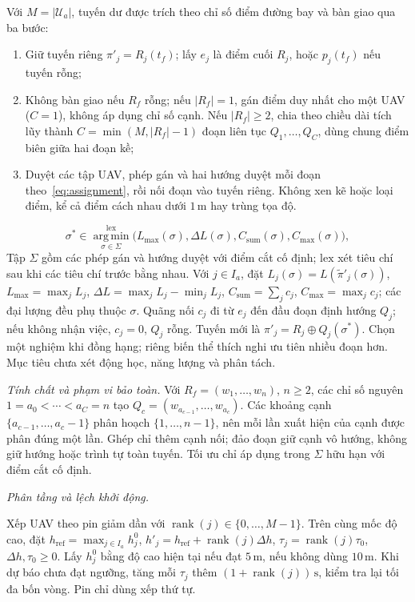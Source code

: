 \documentclass[11pt,a4paper]{article}
\newcommand{\Ua}{\mathcal{U}_{a}}
\newcommand{\Dh}{\Delta h}
\newcommand{\tauzero}{\tau_{0}}
\begin{document}
Với $M=|\Ua|$, tuyến dư được trích theo chỉ số điểm đường bay và bàn giao qua ba bước:
\begin{enumerate}[leftmargin=*,itemsep=2pt]
  \item Giữ tuyến riêng $\pi'_j=R_j(t_f)$; lấy $e_j$ là điểm cuối $R_j$, hoặc $p_j(t_f)$ nếu tuyến rỗng;
  \item Không bàn giao nếu $R_f$ rỗng; nếu $|R_f|=1$, gán điểm duy nhất cho một UAV ($C=1$), không áp dụng chỉ số cạnh. Nếu $|R_f|\ge2$, chia theo chiều dài tích lũy thành $C=\min(M,|R_f|-1)$ đoạn liên tục $Q_1,\ldots,Q_C$, dùng chung điểm biên giữa hai đoạn kề;
  \item Duyệt các tập UAV, phép gán và hai hướng duyệt mỗi đoạn theo~\eqref{eq:assignment}, rồi nối đoạn vào tuyến riêng. Không xen kẽ hoặc loại điểm, kể cả điểm cách nhau dưới $1\,\mathrm{m}$ hay trùng tọa độ.
\end{enumerate}
\begin{equation}
 \sigma^*\in\operatorname*{arg\,min}_{\sigma\in\Sigma}^{\mathrm{lex}}
 \bigl(L_{\max}(\sigma),\Delta L(\sigma),
 C_{\mathrm{sum}}(\sigma),C_{\max}(\sigma)\bigr),
  \label{eq:assignment}
\end{equation}
Tập $\Sigma$ gồm các phép gán và hướng duyệt với điểm cắt cố định; $\mathrm{lex}$ xét tiêu chí sau khi các tiêu chí trước bằng nhau. Với $j\in I_a$, đặt $L_j(\sigma)=L(\widetilde\pi'_j(\sigma))$, $L_{\max}=\max_jL_j$, $\Delta L=\max_jL_j-\min_jL_j$, $C_{\mathrm{sum}}=\sum_jc_j$, $C_{\max}=\max_jc_j$; các đại lượng đều phụ thuộc $\sigma$.
Quãng nối $c_j$ đi từ $e_j$ đến đầu đoạn định hướng $Q_j$; nếu không nhận việc, $c_j=0$, $Q_j$ rỗng. Tuyến mới là $\pi'_j=R_j\oplus Q_j(\sigma^*)$. Chọn một nghiệm khi đồng hạng; riêng biến thể thích nghi ưu tiên nhiều đoạn hơn. Mục tiêu chưa xét động học, năng lượng và phân tách.

\noindent\textit{Tính chất và phạm vi bảo toàn.}
Với $R_f=(w_1,\ldots,w_n)$, $n\ge2$, các chỉ số nguyên $1=a_0<\cdots<a_C=n$ tạo $Q_c=(w_{a_{c-1}},\ldots,w_{a_c})$. Các khoảng cạnh $\{a_{c-1},\ldots,a_c-1\}$ phân hoạch $\{1,\ldots,n-1\}$, nên mỗi lần xuất hiện của cạnh được phân đúng một lần. Ghép chỉ thêm cạnh nối; đảo đoạn giữ cạnh vô hướng, không giữ hướng hoặc trình tự toàn tuyến. Tối ưu chỉ áp dụng trong $\Sigma$ hữu hạn với điểm cắt cố định.

\FloatBarrier
\noindent\textit{Phân tầng và lệch khởi động.}

Xếp UAV theo pin giảm dần với $\operatorname{rank}(j)\in\{0,\ldots,M-1\}$. Trên cùng mốc độ cao, đặt $h_{\mathrm{ref}}=\max_{j\in I_a}h_j^0$, $h'_j=h_{\mathrm{ref}}+\operatorname{rank}(j)\Dh$, $\tau_j=\operatorname{rank}(j)\tauzero$, $\Dh,\tauzero\ge0$. Lấy $h_j^0$ bằng độ cao hiện tại nếu đạt $5\,\mathrm{m}$, nếu không dùng $10\,\mathrm{m}$. Khi dự báo chưa đạt ngưỡng, tăng mỗi $\tau_j$ thêm $(1+\operatorname{rank}(j))\,\mathrm{s}$, kiểm tra lại tối đa bốn vòng. Pin chỉ dùng xếp thứ tự.
\end{document}
